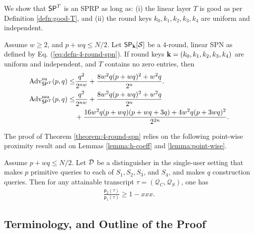 We show that $\mathsf{SP}^T$ is an SPRP as long as: (i) the linear layer $T$ is good as per Definition \ref{defn:good-T}, and (ii) the round keys $k_0,k_1,k_2,k_3,k_4$ are uniform and independent.

\begin{theorem}
	\label{theorem:4-round-spn}
	
	Assume $w\geq2$, and $p+wq\leq N/2$. Let $\mathsf{SP}_{\mathbf{k}}[\mathcal{S}]$ be a 4-round, linear SPN as defined by Eq. (\ref{eq:defn-4-round-spn}). If round keys $\mathbf{k}=(k_0,k_1,k_2,k_3,k_4)$ are uniform and independent, and $T$ contains no zero entries, then
	\begin{align}
	\operatorname{Adv}_{\mathsf{SP}^T}^{\mathrm{su}}(p, q) \leq& \frac{q^2}{2^{n w}} + \frac{8 w^2 q(p+wq)^2+w^2 q}{2^n}   .  
	\notag   \\
	\operatorname{Adv}_{\mathsf{SP}^T}^{\mathrm{mu}}(p, q) \leq& \frac{q^2}{2^{n w}} + \frac{8 w^2 q(p+wq)^2+w^2 q}{2^n}    \notag   \\
	&+ \frac{16 w^2 q(p+w q)(p+w q +3 q)+4 w^2 q(p+3 wq)^2}{2^{2 n}}.
	\notag
	\end{align}
\end{theorem}
The proof of Theorem \ref{theorem:4-round-spn} relies on the following point-wise proximity result and on Lemmas \ref{lemma:h-coeff} and \ref{lemma:point-wise}.


\begin{lemma}
	\label{lemma:proximity-4-round}
	
	Assume $p+wq\leq N/2$. Let $\mathcal{D}$ be a distinguisher in the single-user setting that makes $p$ primitive queries to each of $S_1,S_2,S_3$, and $S_4$, and makes $q$ construction queries. Then for any attainable
	transcript $\tau=(\mathcal{Q}_C,\mathcal{Q}_S)$, one has
	\begin{align}
	\frac{\mathsf{p}_{2}(\tau)}{\mathsf{p}_{1}(\tau)}
	\geq 1 - xxx.
	\label{eq:bound-proximity-4-round}
	\end{align}
\end{lemma}




\subsection{Terminology, and Outline of the Proof}
\label{sec:proof-sketch-4-rounds}

